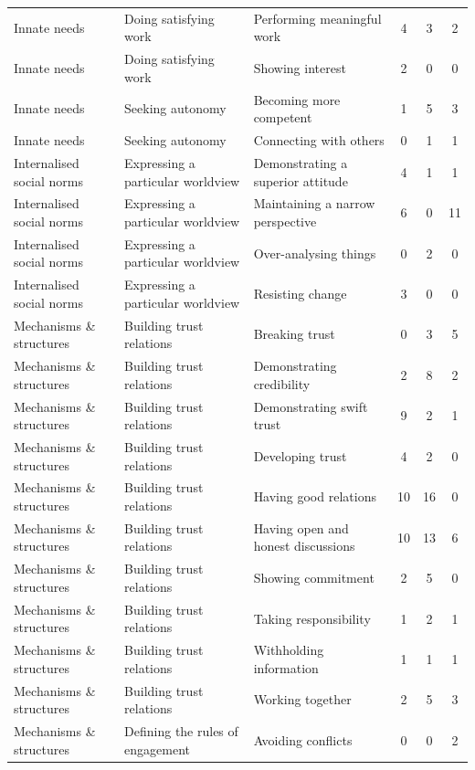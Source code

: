 \begin{landscape}
\begin{longtable}[c]{lllccc}
\midrule
Innate needs & Doing satisfying work & Performing meaningful work &   4 &   3 &   2 \\
Innate needs & Doing satisfying work & Showing interest &   2 &   0 &   0 \\ 
Innate needs & Seeking autonomy & Becoming more competent &   1 &   5 &   3 \\ 
Innate needs & Seeking autonomy & Connecting with others &   0 &   1 &   1 \\ 
Internalised social norms & Expressing a particular worldview & Demonstrating a superior attitude &   4 &   1 &   1 \\ 
Internalised social norms & Expressing a particular worldview & Maintaining a narrow perspective &   6 &   0 &  11 \\ 
Internalised social norms & Expressing a particular worldview & Over-analysing things &   0 &   2 &   0 \\ 
Internalised social norms & Expressing a particular worldview & Resisting change &   3 &   0 &   0 \\ 
Mechanisms \& structures & Building trust relations & Breaking trust &   0 &   3 &   5 \\ 
Mechanisms \& structures & Building trust relations & Demonstrating credibility &   2 &   8 &   2 \\ 
Mechanisms \& structures & Building trust relations & Demonstrating swift trust &   9 &   2 &   1 \\ 
Mechanisms \& structures & Building trust relations & Developing trust &   4 &   2 &   0 \\ 
Mechanisms \& structures & Building trust relations & Having good relations &  10 &  16 &   0 \\ 
Mechanisms \& structures & Building trust relations & Having open and honest discussions &  10 &  13 &   6 \\ 
Mechanisms \& structures & Building trust relations & Showing commitment &   2 &   5 &   0 \\ 
Mechanisms \& structures & Building trust relations & Taking responsibility &   1 &   2 &   1 \\ 
Mechanisms \& structures & Building trust relations & Withholding information &   1 &   1 &   1 \\ 
Mechanisms \& structures & Building trust relations & Working together &   2 &   5 &   3 \\ 
Mechanisms \& structures & Defining the rules of engagement & Avoiding conflicts &   0 &   0 &   2 \\ 

\end{longtable}
\end{landscape}
